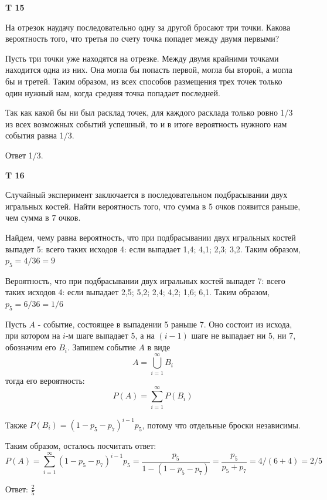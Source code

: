 \documentclass[a4paper,12pt]{article} %
\begin{document}
\begin{example}\textbf{T 15}

На отрезок наудачу последовательно одну за другой бросают три точки. 
Какова вероятность того, что третья по счету точка попадет между двумя первыми?


Пусть три точки уже находятся на отрезке.
Между двумя крайними точками находится одна из них. Она могла бы попасть первой, могла бы второй, а могла бы и третей. 
Таким образом, из всех способов размещения трех точек только один нужный нам, когда средняя точка попадает последней.

Так как какой бы ни был расклад точек, для каждого расклада только ровно 1/3 из всех возможных событий успешный, то и в итоге вероятность нужного нам события равна 1/3.

Ответ 1/3.

\end{example}





\begin{example}\textbf{T 16}

Случайный эксперимент заключается в последовательном подбрасывании двух игральных костей. 
Найти вероятность того, что сумма в 5 очков появится раньше, чем сумма в 7 очков.

Найдем, чему равна вероятность, что при подбрасывании двух игральных костей выпадет 5: 
всего таких исходов 4: если выпадает 1,4; 4,1; 2,3; 3,2. Таким образом, $ p_5=4/36=9 $

Вероятность, что при подбрасывании двух игральных костей выпадет 7: 
всего таких исходов 4: если выпадает 2,5; 5,2; 2,4; 4,2; 1,6; 6,1. Таким образом, $ p_5=6/36=1/6 $


Пусть $A$ - событие, состоящее в выпадении 5 раньше 7. 
Оно состоит из исхода, при котором на $ i$-м шаге выпадает 5, а на $(i-1)$ шаге не выпадает ни 5, ни 7, обозначим его $ B_i $. Запишем событие $ A$ в виде
\[ A=\bigcup_{i=1}^{\infty}B_i \]
тогда его вероятность:
\[ P(A)=\sum_{i=1}^{\infty} P(B_i) \]

Также $ P(B_i)=(1-p_5-p_7)^{i-1}p_5$, потому что отдельные броски независимы.

Таким образом, осталось посчитать ответ:
\[ P(A)=\sum_{i=1}^{\infty} (1-p_5-p_7)^{i-1}p_5=\frac{p_5}{1-(1-p_5-p_7)}=\frac{p_5}{p_5+p_7}=4/(6+4)=2/5 \]

Ответ: $ \frac{2}{5} $

\end{example}
\end{document}
